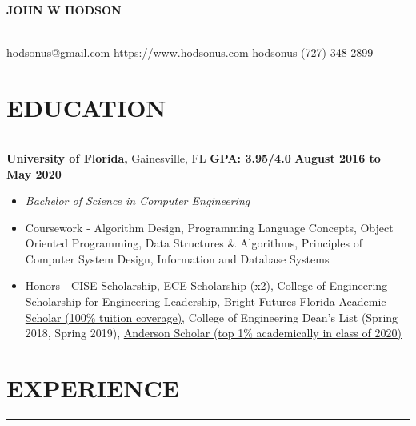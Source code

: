 \documentclass[11pt]{article} %
\begin{document}
	
	\noindent\centerline{ \huge\textbf{JOHN W HODSON}}\\
	
	\noindent \faEnvelopeSquare \space\href{mailto:hodsonus@gmail.com}{hodsonus@gmail.com} \hspace*{\fill} \faHome \space \href{https://www.hodsonus.com}{https://www.hodsonus.com} \hspace*{\fill} \faGithub \space \href{https://github.com/hodsonus}{hodsonus} \hspace*{\fill} \faMobilePhone \space (727) 348-2899\\
	
	\section*{EDUCATION}
		\hrule \relax
		\vspace{.4cm}
		
		\noindent \textbf{University of Florida,} Gainesville, FL
		\hfill\textbf{GPA: 3.95/4.0}
		\hfill\textbf{August 2016 to May 2020}
		
		\begin{itemize}[noitemsep,nolistsep, label = {-}]
			\item  \textit{Bachelor of Science in Computer Engineering}
			\item  Coursework - 
											Algorithm Design,
											Programming Language Concepts,
											Object Oriented Programming,
											Data Structures \& Algorithms,
											Principles of Computer System Design,
											Information and Database Systems
			\item  Honors - 
											CISE Scholarship,
											ECE Scholarship (x2),
											\href{https://www.eng.ufl.edu/leadership/students/thomas-o-hunter-leadership-scholarship/}
													{College of Engineering Scholarship for Engineering Leadership},
											\href{https://www.sfa.ufl.edu/types-of-aid/bright-futures/}
													{Bright Futures Florida Academic Scholar (100\% tuition coverage)},
											College of Engineering Dean\rq s List (Spring 2018, Spring 2019),
											\href{https://sites.clas.ufl.edu/clas-main/undergraduate/anderson-scholars/anderson-scholars-listing/}
													{Anderson Scholar (top 1\% academically in class of 2020)}
		\end{itemize}
		
		\vspace{.20cm}
	
	\section*{EXPERIENCE}
		\hrule \relax
		\vspace{.4cm}
		
\end{document}
